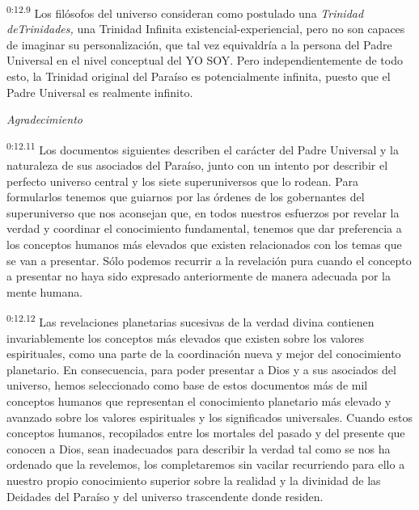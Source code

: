\par
\textsuperscript{0:12.9} Los filósofos del universo consideran como postulado una \textit{Trinidad deTrinidades,} una Trinidad Infinita existencial-experiencial, pero no son capaces de imaginar su personalización, que tal vez equivaldría a la persona del Padre Universal en el nivel conceptual del YO SOY. Pero independientemente de todo esto, la Trinidad original del Paraíso es potencialmente infinita, puesto que el Padre Universal es realmente infinito.

\par[Agradecimiento]{\textit{Agradecimiento}}
\par
\textsuperscript{0:12.11} Los documentos siguientes describen el carácter del Padre Universal y la naturaleza de sus asociados del Paraíso, junto con un intento por describir el perfecto universo central y los siete superuniversos que lo rodean. Para formularlos tenemos que guiarnos por las órdenes de los gobernantes del superuniverso que nos aconsejan que, en todos nuestros esfuerzos por revelar la verdad y coordinar el conocimiento fundamental, tenemos que dar preferencia a los conceptos humanos más elevados que existen relacionados con los temas que se van a presentar. Sólo podemos recurrir a la revelación pura cuando el concepto a presentar no haya sido expresado anteriormente de manera adecuada por la mente humana.

\par
\textsuperscript{0:12.12} Las revelaciones planetarias sucesivas de la verdad divina contienen invariablemente los conceptos más elevados que existen sobre los valores espirituales, como una parte de la coordinación nueva y mejor del conocimiento planetario. En consecuencia, para poder presentar a Dios y a sus asociados del universo, hemos seleccionado como base de estos documentos más de mil conceptos humanos que representan el conocimiento planetario más elevado y avanzado sobre los valores espirituales y los significados universales. Cuando estos conceptos humanos, recopilados entre los mortales del pasado y del presente que conocen a Dios, sean inadecuados para describir la verdad tal como se nos ha ordenado que la revelemos, los completaremos sin vacilar recurriendo para ello a nuestro propio conocimiento superior sobre la realidad y la divinidad de las Deidades del Paraíso y del universo trascendente donde residen.

